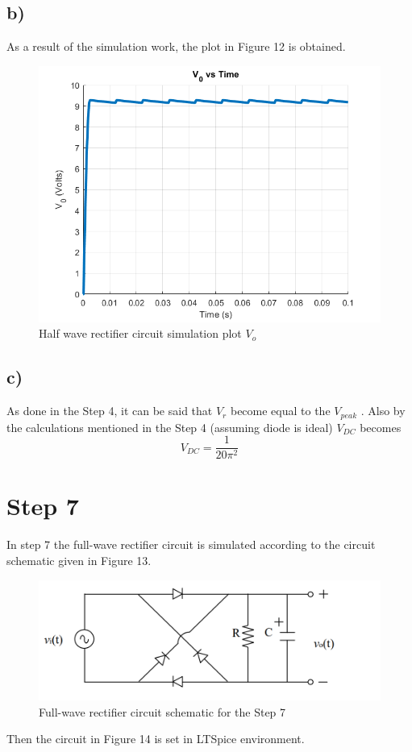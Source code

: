 \documentclass[letterpaper,12pt]{article}
\begin{document}
\subsection{b)}
As a result of the simulation work, the plot in Figure 12 is obtained.
\begin{figure}[H]
    \centering
   \includegraphics[width=1\textwidth]{6.png}
   \caption{Half wave rectifier circuit simulation plot \(V_o\) }
\end{figure} 



\subsection{c)}
As done in the Step 4, it can be said that \(V_r\) become equal to the \(V_{peak}\) . Also by the calculations mentioned in the Step 4 (assuming diode is ideal) \(V_{DC}\) becomes \[V_{DC} = \frac{1}{20 \pi^2}\]
\section{Step 7}
In step 7 the full-wave rectifier circuit is simulated according to the circuit schematic given in Figure 13.

\begin{figure}[H]
    \centering
   \includegraphics[width=1\textwidth]{7_1.png}
   \caption{Full-wave rectifier circuit schematic for the Step 7}
\end{figure} 
Then  the circuit in Figure 14 is set in  LTSpice environment.
\end{document}
